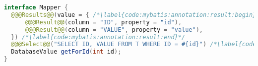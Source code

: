 
\begin{lstlisting}[language=Java, caption={MyBatis Mapper interface using annotations}, label={code:mybatis:annotation}]
interface Mapper {
  @@@Results@@(value = { /*\label{code:mybatis:annotation:result:begin}*/
      @@@Result@@(column = "ID", property = "id"),
      @@@Result@@(column = "VALUE", property = "value"),
  }) /*\label{code:mybatis:annotation:result:end}*/
  @@@Select@@("SELECT ID, VALUE FROM T WHERE ID = #{id}") /*\label{code:mybatis:annotation:query}*/
  DatabaseValue getForId(int id);
}
\end{lstlisting}
